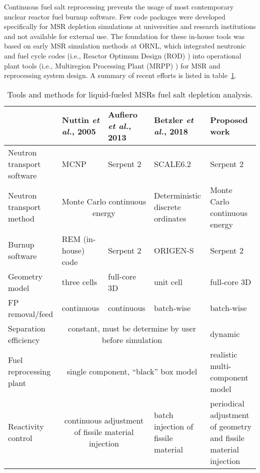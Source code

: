 Continuous fuel salt reprocessing prevents the usage of most contemporary 
nuclear reactor fuel burnup software. Few code packages were developed 
specifically for \gls{MSR} depletion simulations at universities and research 
institutions and not available for external use. The foundation for these 
in-house tools was based on early \gls{MSR} simulation methods at \gls{ORNL}, 
which integrated neutronic and fuel cycle codes (i.e., Reactor Optimum Design 
(ROD) \cite{bauman_rod_1971}) into operational plant tools (i.e., Multiregion 
Processing Plant (MRPP) \cite{kee_mrpp_1976}) for \gls{MSR} and reprocessing 
system design. A summary of recent efforts is listed in 
table~\ref{tab:msr_codes}.
\begin{table}[t]
\fontsize{9}{11}\selectfont
\caption{Tools and methods for liquid-fueled \glspl{MSR} fuel salt depletion 
analysis.}
\begin{tabularx}{\textwidth}{X X X X X} 
\hline 
&Nuttin \emph{et al.}, 2005 \cite{nuttin_potential_2005}& Aufiero \emph{et al.}, 
2013 \cite{aufiero_extended_2013} & Betzler \emph{et al.}, 2018 
\cite{betzler_fuel_2018}&Proposed work \\ [12pt]
\hline
Neutron transport software & \gls{MCNP} & Serpent 2 & SCALE6.2 & Serpent 2 \\ 
[12pt]
Neutron transport method & \multicolumn{2}{c}{Monte Carlo continuous energy} & 
Deterministic discrete ordinates & Monte Carlo continuous energy \\ [12pt]
Burnup software & REM (in-house) code & Serpent 2 & ORIGEN-S & Serpent 2 \\ 
[12pt]
Geometry model & three cells & full-core 3D & unit cell & full-core 3D\\ [12pt]
\gls{FP} removal/feed  & continuous &continuous & batch-wise & batch-wise\\ 
[12pt]
Separation efficiency &\multicolumn{3}{c}{constant, must be determine by user 
before simulation} & dynamic \\ [12pt]
Fuel reprocessing plant & \multicolumn{3}{c}{single component, ``black'' box 
model} & realistic multi-component model\\ [12pt]
Reactivity control & \multicolumn{2}{c}{continuous adjustment of fissile 
material injection} & batch injection of fissile material & periodical 
adjustment of geometry and fissile material injection\\
\hline
\end{tabularx}
  \label{tab:msr_codes}
\end{table}

